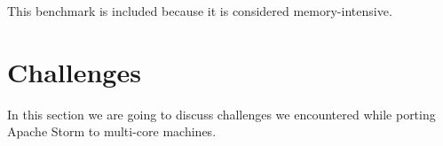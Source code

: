 This benchmark is included because it is considered memory-intensive. 


\section{Challenges}

In this section we are going to discuss challenges we encountered while porting Apache Storm to multi-core machines.



